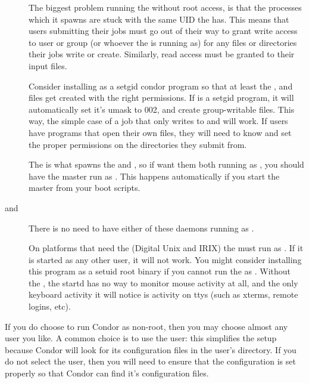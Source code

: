 \begin{description}
\item[] The biggest problem running the 
    without root access, is that the  processes which it
    spawns are stuck with the same UID the  has.  This
    means that users submitting their jobs must go out of their way
    to grant write access to user or group  (or whoever the
     is running as) for any files or directories their jobs
    write or create.  Similarly, read access must be granted to their
    input files.

    Consider installing  as a setgid condor
    program so that at least the ,  and
     files get created with the right permissions.  If
     is a setgid program, it will automatically set
    it's umask to 002, and create group-writable files.  This
    way, the simple case of a job that only writes to 
    and  will work.  If users have programs that open
    their own files, they will need to know and set the proper permissions
    on the directories they submit from.

\item[] The  is what spawns the
     and , so if want them both running
    as , you should have the master run as .
    This happens
    automatically if you start the master from your boot scripts.

\item[ and ]
    There is no need to have either of these daemons running as .

\item[] On platforms that need the  (Digital
    Unix and IRIX) the  must run as .  If it is
    started as any other user, it will not work.  You might consider
    installing this program as a setuid root binary if you cannot run
    the  as .  Without the , the
    startd has no way to monitor mouse activity at all, and the only
    keyboard activity it will notice is activity on ttys (such as
    xterms, remote logins, etc).

\end{description}

If you do choose to run Condor as non-root, then you may choose almost any
user you like. A common choice is to use the  user: this
simplifies the setup because Condor will look for its configuration
files in the  user's directory. If you do not
select the 
user, then you will need to ensure that the configuration is set
properly so that Condor can find it's configuration files. 

